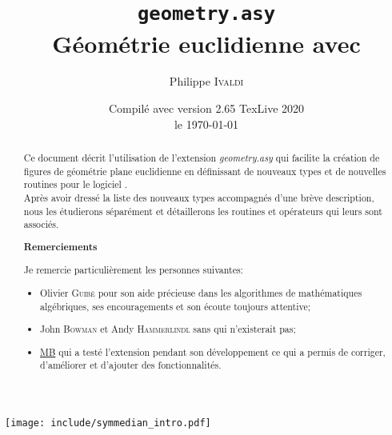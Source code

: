 \documentclass[pdftex]{article}
\newcommand{\geo}{l'extension \emph{geometry.asy}\xspace}
\begin{document}
\renewcommand{\thefootnote}{\fnsymbol{footnote}}

\title{\texttt{geometry.asy}\footnotemark[1]\\
  Géométrie euclidienne avec \asymptote}
\author{Philippe \textsc{Ivaldi}}
\date{Compilé avec \Asymptote{} version 2.65 TexLive 2020\\le \today}
\maketitle
\hspace*{0mm}\hfill
\begin{center}
  \texttt{[image: include/symmedian\_intro.pdf]}
\end{center}
\hfill\hspace*{0mm}

\renewcommand{\thefootnote}{\arabic{footnote}}
\newpage
\begin{abstract}
  \noindent%
  Ce document décrit l'utilisation de \geo qui facilite la création de
  figures de géométrie plane euclidienne en définissant de nouveaux
  types et de nouvelles routines pour le logiciel
  \href{http://asymptote.sourceforge.net/}{\Asymptote}.\\
  Après avoir dressé la liste des nouveaux types accompagnés d'une
  brève description, nous les étudierons séparément et détaillerons les
  routines et opérateurs qui leurs sont associés.
  \begin{center}\bfseries
    Remerciements
  \end{center}
  Je remercie particulièrement les personnes suivantes:
  \begin{itemize}
  \item Olivier \textsc{Guibé} pour son aide précieuse dans les
    algorithmes de mathématiques algébriques, ses encouragements et
    son écoute toujours attentive;
  \item John \textsc{Bowman} et Andy \textsc{Hammerlindl} sans qui
    \asymptote n'existerait pas;
  \item \href{http://forum.mathematex.net/membre3.html}{MB} qui a
    testé l'extension pendant son développement ce qui a permis de
    corriger, d'améliorer et d'ajouter des fonctionnalités.
  \end{itemize}
\end{abstract}
\tableofcontents
\end{document}
